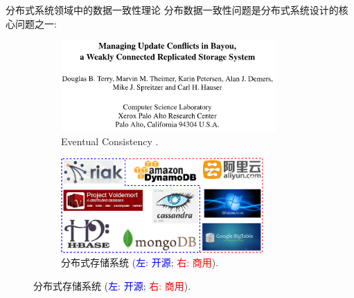 \begin{frame}{分布式系统领域中的数据一致性理论}
  分布数据一致性问题是分布式系统设计的核心问题之一:
  \vspace{0.50cm}

  \begin{figure}
	\begin{subfigure}{0.48\textwidth}
	  \centering
	  \includegraphics[width = 0.90\textwidth]{figures/bayou-paper.png}
	  \caption{Eventual Consistency .}
	\end{subfigure}%
	\begin{subfigure}{0.48\textwidth}
	  \centering
	  \includegraphics[width = 0.85\textwidth]{figures/dsss.pdf}
	  \caption{分布式存储系统 {\tiny (\textcolor{blue}{左: 开源}; \textcolor{red}{右: 商用})}.} %
	\end{subfigure}
  \end{figure}
\end{frame}
% 
